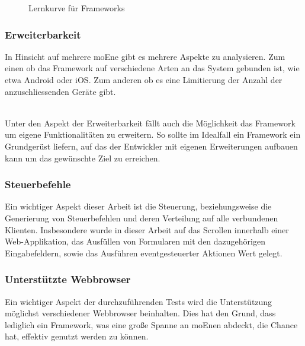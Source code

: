 \begin{figure}[H]
	\centering
	\vspace{-25pt}
	\caption[Darstellung der Lernkurve für \Gls{Framework}s]{Lernkurve für \Gls{Framework}s}
\end{figure}
\vspace{-40pt}


	\pagebreak
	 \subsubsection{Erweiterbarkeit}
	 In Hinsicht auf mehrere \Gls{moEn}e gibt es mehrere Aspekte zu analysieren. Zum einen ob das \Gls{Framework} auf verschiedene 	Arten an das System gebunden ist, wie etwa Android oder iOS. Zum anderen ob es eine Limitierung der Anzahl der 				anzuschliessenden Geräte gibt. 

	\\Unter den Aspekt der Erweiterbarkeit fällt auch die Möglichkeit das \Gls{Framework} um eigene Funktionalitäten zu erweitern. So 		sollte im Idealfall ein \Gls{Framework} ein Grundgerüst liefern, auf das der Entwickler mit eigenen Erweiterungen aufbauen kann um 	das gewünschte Ziel zu erreichen.
	
	\subsubsection{Steuerbefehle}
	Ein wichtiger Aspekt dieser Arbeit ist die Steuerung, beziehungsweise die Generierung von Steuerbefehlen und deren Verteilung auf alle verbundenen Klienten. Insbesondere wurde in dieser Arbeit auf das Scrollen innerhalb einer \mbox{Web-Applikation}, das Ausfüllen von Formularen mit den dazugehörigen Eingabefeldern, sowie das Ausführen eventgesteuerter Aktionen Wert gelegt.

	\subsubsection{Unterstützte \Gls{Webbrowser}}
	Ein wichtiger Aspekt der durchzuführenden Tests wird die Unterstützung möglichst verschiedener \Gls{Webbrowser} beinhalten. Dies hat den Grund, dass lediglich ein \Gls{Framework}, was eine große Spanne an \Gls{moEn}en abdeckt, die Chance hat, effektiv genutzt werden zu können.

